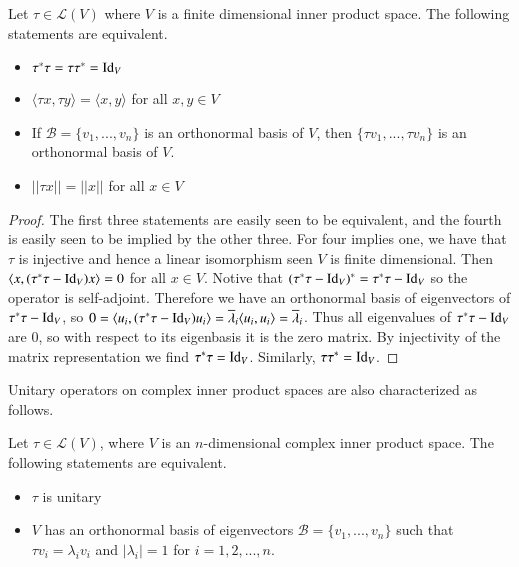 \begin{theorem}
    Let $\tau \in \mathcal{L}(V)$ where $V$ is a finite dimensional inner product space. The following statements are equivalent. \begin{itemize}
        \item $\tau^*\tau = \tau\tau^* = \operatorname{Id}_V$
        \item $\langle \tau x,\tau y\rangle = \langle x,y\rangle$ for all $x,y \in V$
        \item If $\mathcal{B} = \{v_1,...,v_n\}$ is an orthonormal basis of $V$, then $\{\tau v_1,...,\tau v_n\}$ is an orthonormal basis of $V$.
        \item $||\tau x|| = ||x||$ for all $x \in V$
    \end{itemize}
\end{theorem}
\begin{proof}
    The first three statements are easily seen to be equivalent, and the fourth is easily seen to be implied by the other three. For four implies one, we have that $\tau$ is injective and hence a linear isomorphism seen $V$ is finite dimensional. Then $\langle x,(\tau^*\tau-\operatorname{Id}_V)x\rangle = 0$ for all $x \in V$. Notive that $(\tau^*\tau-\operatorname{Id}_V)^* = \tau^*\tau-\operatorname{Id}_V$ so the operator is self-adjoint. Therefore we have an orthonormal basis of eigenvectors of $\tau^*\tau-\operatorname{Id}_V$, so $0 = \langle u_i,(\tau^*\tau-\operatorname{Id}_V)u_i\rangle = \overline{\lambda}_i\langle u_i,u_i\rangle = \overline{\lambda}_i$. Thus all eigenvalues of $\tau^*\tau-\operatorname{Id}_V$ are $0$, so with respect to its eigenbasis it is the zero matrix. By injectivity of the matrix representation we find $\tau^*\tau = \operatorname{Id}_V$. Similarly, $\tau\tau^* = \operatorname{Id}_V$.
\end{proof}

Unitary operators on complex inner product spaces are also characterized as follows.

\begin{theorem}
    Let $\tau \in \mathcal{L}(V)$, where $V$ is an $n$-dimensional complex inner product space. The following statements are equivalent. \begin{itemize}
        \item $\tau$ is unitary
        \item $V$ has an orthonormal basis of eigenvectors $\mathcal{B} = \{v_1,...,v_n\}$ such that $\tau v_i = \lambda_iv_i$ and $|\lambda_i| = 1$ for $i = 1,2,...,n$.
    \end{itemize}
\end{theorem}

